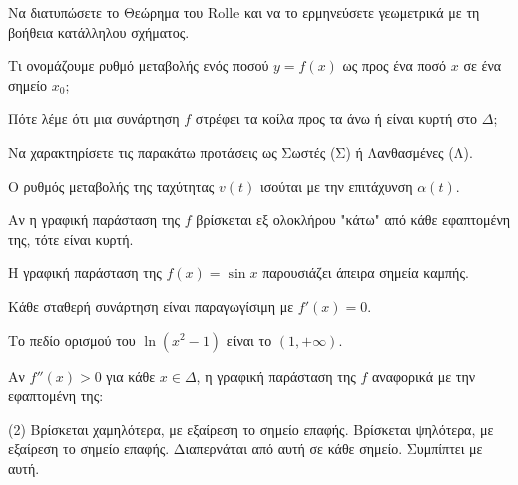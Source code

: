 \documentclass[11pt,a4paper]{article}
\newcommand{\kerkissans}[1]{{\fontfamily{maksf}\selectfont \textbf{#1}}}
\renewcommand{\textdexiakeraia}{}
\newcommand\themanum{A}
\newcounter{thema}[section]
\renewcommand{\thethema}{\arabic{thema}}
\newcommand{\Thema}{\refstepcounter{thema}{\textbf{\textcolor{black}{\faPenSquare\ \  \large \kerkissans{\textbf{\thethemaο\hspace{2mm}Θέμα}}}}}\hspace{0mm}}{}
\newenvironment{thema}[1]
{\begin{tcolorbox}[title=\Thema\kerkissans{\textbf{\large{  #1}}},breakable,
enhanced standard,titlerule=0pt,toprule=0pt, rightrule=0pt, bottomrule=0pt,
colback=white,left=0mm,top=1mm,bottom=0mm,
boxrule=0pt,
colframe=white,leftrule=0mm,sharp corners,coltitle=black]
\renewcommand{\themanum}{#1}}
{\end{tcolorbox}}
\begin{document}
\begin{thema}{A}
\begin{erwthma}
    \item Να διατυπώσετε το Θεώρημα του Rolle και να το ερμηνεύσετε γεωμετρικά με τη βοήθεια κατάλληλου σχήματος.
    \item Τι ονομάζουμε ρυθμό μεταβολής ενός ποσού $y=f(x)$ ως προς ένα ποσό $x$ σε ένα σημείο $x_0$;
    \item Πότε λέμε ότι μια συνάρτηση $f$ στρέφει τα κοίλα προς τα άνω ή είναι κυρτή στο $\Delta$;
    \item Να χαρακτηρίσετε τις παρακάτω προτάσεις ως Σωστές (Σ) ή Λανθασμένες (Λ).
    \begin{alist}
        \item Ο ρυθμός μεταβολής της ταχύτητας $v(t)$ ισούται με την επιτάχυνση $\alpha(t)$.
        \item Αν η γραφική παράσταση της $f$ βρίσκεται εξ ολοκλήρου "κάτω" από κάθε εφαπτομένη της, τότε είναι κυρτή.
        \item Η γραφική παράσταση της $f(x) = \sin x$ παρουσιάζει άπειρα σημεία καμπής.
        \item Κάθε σταθερή συνάρτηση είναι παραγωγίσιμη με $f'(x)=0$.
        \item Το πεδίο ορισμού του $\ln(x^2 - 1)$ είναι το $(1, +\infty)$.
    \end{alist}
    \item Αν $f''(x) > 0$ για κάθε $x \in \Delta$, η γραφική παράσταση της $f$ αναφορικά με την εφαπτομένη της:
    \begin{tasks}[label=\let\textdexiakeraia\relax\alph*.](2)
        \task Βρίσκεται χαμηλότερα, με εξαίρεση το σημείο επαφής.
        \task Βρίσκεται ψηλότερα, με εξαίρεση το σημείο επαφής.
        \task Διαπερνάται από αυτή σε κάθε σημείο.
        \task Συμπίπτει με αυτή.
    \end{tasks}
\end{erwthma}
\end{thema}
\vspace{1cm}
\end{document}
